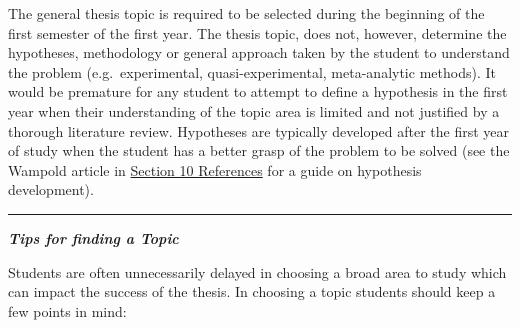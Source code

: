 \documentclass[openany]{book}
\begin{document}
The general thesis topic is required to be selected during the beginning of the first semester of the first year. The thesis topic, does not, however, determine the hypotheses, methodology or general approach taken by the student to understand the problem (e.g.~experimental, quasi-experimental, meta-analytic methods). It would be premature for any student to attempt to define a hypothesis in the first year when their understanding of the topic area is limited and not justified by a thorough literature review. Hypotheses are typically developed after the first year of study when the student has a better grasp of the problem to be solved (see the Wampold article in \protect\hyperlink{resources}{Section 10 References} for a guide on hypothesis development).

\begin{center}\rule{0.5\linewidth}{0.5pt}\end{center}

\textbf{\emph{Tips for finding a Topic}}

Students are often unnecessarily delayed in choosing a broad area to study which can impact the success of the thesis. In choosing a topic students should keep a few points in mind:
\end{document}
